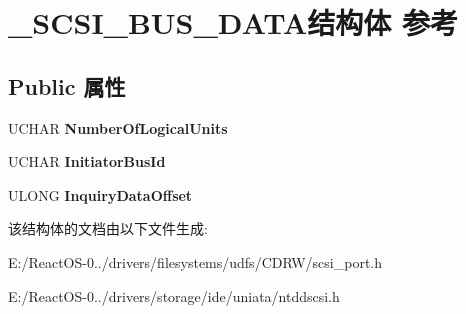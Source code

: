 \hypertarget{struct___s_c_s_i___b_u_s___d_a_t_a}{}\section{\+\_\+\+S\+C\+S\+I\+\_\+\+B\+U\+S\+\_\+\+D\+A\+T\+A结构体 参考}
\label{struct___s_c_s_i___b_u_s___d_a_t_a}
\subsection*{Public 属性}
\begin{DoxyCompactItemize}
\item 
\mbox{\label{struct___s_c_s_i___b_u_s___d_a_t_a_a8762d27fa34b55b54cc519c013fe4217}} 
U\+C\+H\+AR {\bfseries Number\+Of\+Logical\+Units}
\item 
\mbox{\label{struct___s_c_s_i___b_u_s___d_a_t_a_aa9e04e9d69d270b22b072c1ffe871819}} 
U\+C\+H\+AR {\bfseries Initiator\+Bus\+Id}
\item 
\mbox{\label{struct___s_c_s_i___b_u_s___d_a_t_a_a1d395581db6b1569113b1d9820f25b20}} 
U\+L\+O\+NG {\bfseries Inquiry\+Data\+Offset}
\end{DoxyCompactItemize}


该结构体的文档由以下文件生成\+:\begin{DoxyCompactItemize}
\item 
E\+:/\+React\+O\+S-\/0../drivers/filesystems/udfs/\+C\+D\+R\+W/scsi\+\_\+port.\+h\item 
E\+:/\+React\+O\+S-\/0../drivers/storage/ide/uniata/ntddscsi.\+h\end{DoxyCompactItemize}
